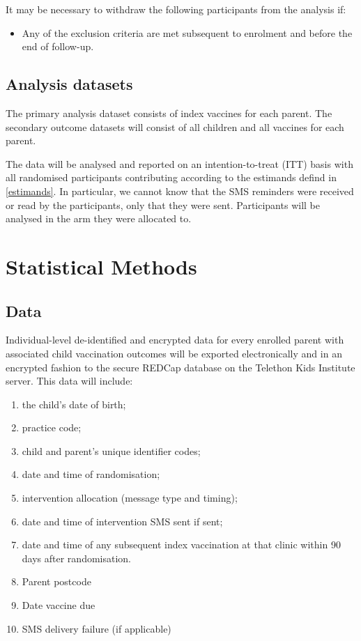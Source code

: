 \documentclass[
  bibliography=totoc]{scrreprt}
\providecommand{\tightlist}{%
  \setlength{\itemsep}{0pt}\setlength{\parskip}{0pt}}
\begin{document}
It may be necessary to withdraw the following participants from the analysis if:

\begin{itemize}
\tightlist
\item
  Any of the exclusion criteria are met subsequent to enrolment and before the end of follow-up.
\end{itemize}

\hypertarget{analysis-datasets}{%
\section{Analysis datasets}\label{analysis-datasets}}

The primary analysis dataset consists of index vaccines for each parent.
The secondary outcome datasets will consist of all children and all vaccines for each parent.

The data will be analysed and reported on an intention-to-treat (ITT) basis with all randomised participants contributing according to the estimands defind in \ref{estimands}.
In particular, we cannot know that the SMS reminders were received or read by the participants, only that they were sent.
Participants will be analysed in the arm they were allocated to.

\hypertarget{statistical-methods}{%
\chapter{Statistical Methods}\label{statistical-methods}}

\hypertarget{data}{%
\section{Data}\label{data}}

Individual-level de-identified and encrypted data for every enrolled parent with associated child vaccination outcomes will be exported electronically and in an encrypted fashion to the secure REDCap database on the Telethon Kids Institute server.
This data will include:

\begin{enumerate}
\def\labelenumi{\arabic{enumi}.}
\tightlist
\item
  the child's date of birth;
\item
  practice code;
\item
  child and parent's unique identifier codes;
\item
  date and time of randomisation;
\item
  intervention allocation (message type and timing);
\item
  date and time of intervention SMS sent if sent;
\item
  date and time of any subsequent index vaccination at that clinic within 90 days after randomisation.
\item
  Parent postcode
\item
  Date vaccine due
\item
  SMS delivery failure (if applicable)
\end{enumerate}
\end{document}
